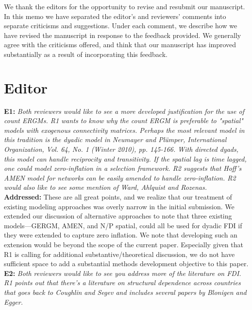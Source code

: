 \documentclass[a4paper,11pt]{texMemo}
\begin{document}
\maketitle

\noindent We thank the editors for the opportunity to revise and resubmit our manuscript. In this memo
we have separated the editor's and reviewers' comments into separate criticisms and
suggestions. Under each comment, we describe how we have revised the manuscript in
response to the feedback provided. We generally agree with the criticisms offered, and think
that our manuscript has improved substantially as a result of incorporating this feedback.


\section*{Editor}

\noindent \textbf{E1:} \emph{Both reviewers would like to see a more developed justification for the use of count ERGMs. R1 wants to know why the count ERGM is preferable to "spatial" models with exogenous connectivity matrices. Perhaps the most relevant model in this tradition is the dyadic model in Neumayer and Plümper, International Organization, Vol. 64, No. 1 (Winter 2010), pp. 145-166. With directed dyads, this model can handle reciprocity and transitivity. If the spatial lag is time lagged, one could model zero-inflation in a selection framework. R2 suggests that Hoff's AMEN model for networks can be easily amended to handle zero-inflation. R2 would also like to see some mention of Ward, Ahlquist and Rozenas.}\\

\noindent \textbf{Addressed:} These are all great points, and we realize that our treatment of existing modeling approaches was overly narrow in the initial submission. We extended our discussion of alternative approaches to note that three existing models---GERGM, AMEN, and N/P spatial, could all be used for dyadic FDI if they were extended to capture zero inflation. We note that developing such an extension would be beyond the scope of the current paper. Especially given that R1 is calling for additional substantive/theoretical discussion, we do not have sufficient space to add a substantial methods development objective to this paper. \\

\noindent \textbf{E2:} \emph{Both reviewers would like to see you address more of the literature on FDI. R1 points out that there's a literature on structural dependence across countries that goes back to Coughlin and Segev and includes several papers by Blonigen and Egger.} \\
\end{document}
